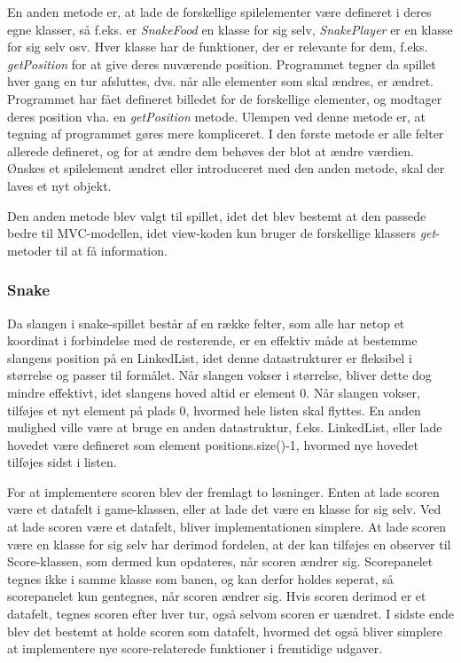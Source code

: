 \documentclass{report}
\begin{document}
En anden metode er, at lade de forskellige spilelementer være defineret i deres egne klasser, så f.eks. er \textit{SnakeFood} en klasse for sig selv, \textit{SnakePlayer} er en klasse for sig selv osv. Hver klasse har de funktioner, der er relevante for dem, f.eks. \textit{getPosition} for at give deres nuværende position. Programmet tegner da spillet hver gang en tur afsluttes, dvs. når alle elementer som skal ændres, er ændret. Programmet har fået defineret billedet for de forskellige elementer, og modtager deres position vha. en \textit{getPosition} metode.
 Ulempen ved denne metode er, at tegning af programmet gøres mere kompliceret. I den første metode er alle felter allerede defineret, og for at ændre dem behøves der blot at ændre værdien. Ønskes et spilelement ændret eller introduceret med den anden metode, skal der laves et nyt objekt.
 
Den anden metode blev valgt til spillet, idet det blev bestemt at den passede bedre til MVC-modellen, idet view-koden kun bruger de forskellige klassers \textit{get}-metoder til at få information. %

\subsubsection{Snake}
Da slangen i snake-spillet består af en række felter, som alle har netop et koordinat i forbindelse med de resterende, er en effektiv måde at bestemme slangens position på en LinkedList, idet denne datastrukturer er fleksibel i størrelse og passer til formålet. Når slangen vokser i størrelse, bliver dette dog mindre effektivt, idet slangens hoved altid er element 0. Når slangen vokser, tilføjes et nyt element på plads 0, hvormed hele listen skal flyttes. En anden mulighed ville være at bruge en anden datastruktur, f.eks. LinkedList, eller lade hovedet være defineret som element positions.size()-1, hvormed nye hovedet tilføjes sidst i listen.

For at implementere scoren blev der fremlagt to løsninger. Enten at lade scoren være et datafelt i game-klassen, eller at lade det være en klasse for sig selv. Ved at lade scoren være et datafelt, bliver implementationen simplere. At lade scoren være en klasse for sig selv har derimod fordelen, at der kan 
tilføjes en observer til Score-klassen, som dermed kun opdateres, når scoren ændrer sig. Scorepanelet tegnes ikke i samme klasse som banen, og kan derfor holdes seperat, så scorepanelet kun gentegnes, når scoren ændrer sig. Hvis scoren derimod er et datafelt, tegnes scoren efter hver tur, også selvom scoren er uændret. I sidste ende blev det bestemt at holde scoren som datafelt, hvormed det også bliver simplere at implementere nye score-relaterede funktioner i fremtidige udgaver.
\end{document}
